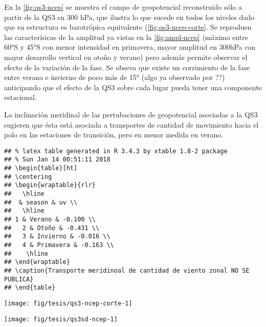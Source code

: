 \documentclass[spanish,a4paper]{book}
\begin{document}
En la \autoref{fig:qs3-ncep} se muestra el campo de geopotencial
reconstruido sólo a partir de la QS3 en 300 hPa, que ilustra lo que
sucede en todos los niveles dado que su estructura es barotrópica
equivalente (\autoref{fig:qs3-ncep-corte}. Se reproduen las
caracterísicas de la amplitud ya vistas en la \autoref{fig:ampl-ncep}
(máximo entre 60°S y 45°S con menor intensidad en primavera, mayor
amplitud en 300hPa con mayor desarrollo vertical en otoño y verano) pero
además permite observar el efecto de la variación de la fase. Se obseva
que existe un corrimiento de la fase entre verano e invierno de poco más
de 15° (algo ya observado por
??)
anticipando que el efecto de la QS3 sobre cada lugar 
pueda tener una componente estacional.

La inclinación meridinal de las pertubaciones de geopotencial asociadas
a la QS3 sugieren que ésta está asociada a transportes de cantidad de
movimiento hacia el polo en las estaciones de transición, pero en menor
medida en verano.

\begin{verbatim}
## % latex table generated in R 3.4.3 by xtable 1.8-2 package
## % Sun Jan 14 00:51:11 2018
## \begin{table}[ht]
## \centering
## \begin{wraptable}{rlr}
##   \hline
##  & season & uv \\ 
##   \hline
## 1 & Verano & -0.100 \\ 
##   2 & Otoño & -0.431 \\ 
##   3 & Invierno & -0.016 \\ 
##   4 & Primavera & -0.163 \\ 
##    \hline
## \end{wraptable}
## \caption{Transporte meridinoal de cantidad de viento zonal NO SE PUBLICA} 
## \end{table}
\end{verbatim}

\begin{figure*}
\texttt{[image: fig/tesis/qs3-ncep-corte-1]} \caption{Corte - fig:qs3-ncep-corte}\label{fig:qs3-ncep-corte}
\end{figure*}

\begin{figure*}
\texttt{[image: fig/tesis/qs3sd-ncep-1]} \caption{Desvío estándar de la reconstrucción de QS3. - fig:qs3sd-ncep}\label{fig:qs3sd-ncep}
\end{figure*}
\end{document}
